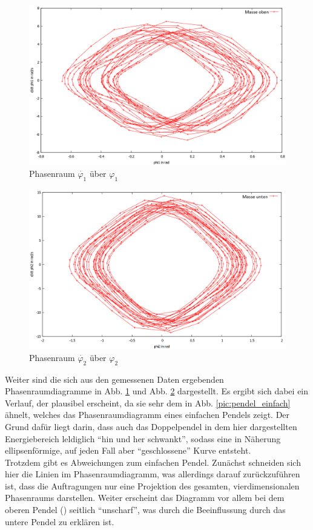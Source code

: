 \begin{figure}
        \includegraphics[width=.9\textwidth]{images/phi1_ueberphi1_neu.png}
\caption{Phasenraum $\dot{\varphi_1} $ über $\varphi_1$}
\label{phi1}
\end{figure}

\begin{figure}
        \includegraphics[width=.9\textwidth]{images/phi2_ueberphi2_neu.png}
\caption{Phasenraum $\dot{\varphi_2} $ über $\varphi_2$}
\label{phi2}
\end{figure}

Weiter sind die sich aus den gemessenen Daten ergebenden Phasenraumdiagramme in Abb. \ref{phi1} und Abb. \ref{phi2} dargestellt. Es ergibt sich dabei ein Verlauf, der plausibel erscheint, da sie sehr dem in Abb. \ref{pic:pendel_einfach} ähnelt, welches das Phasenraumdiagramm eines einfachen Pendels zeigt. Der Grund dafür liegt darin, dass auch das Doppelpendel in dem hier dargestellten Energiebereich leldiglich \enquote{hin und her schwankt}, sodass eine in Näherung ellipsenförmige, auf jeden Fall aber \enquote{geschlossene} Kurve entsteht. \\
Trotzdem gibt es Abweichungen zum einfachen Pendel. Zunächst schneiden sich hier die Linien im Phasenraumdiagramm, was allerdings darauf zurückzuführen ist, dass die Auftragungen nur eine Projektion des gesamten, vierdimensionalen Phasenraums darstellen. Weiter erscheint das Diagramm vor allem bei dem oberen Pendel () seitlich \enquote{unscharf}, was durch die Beeinflussung durch das untere Pendel zu erklären ist. 

